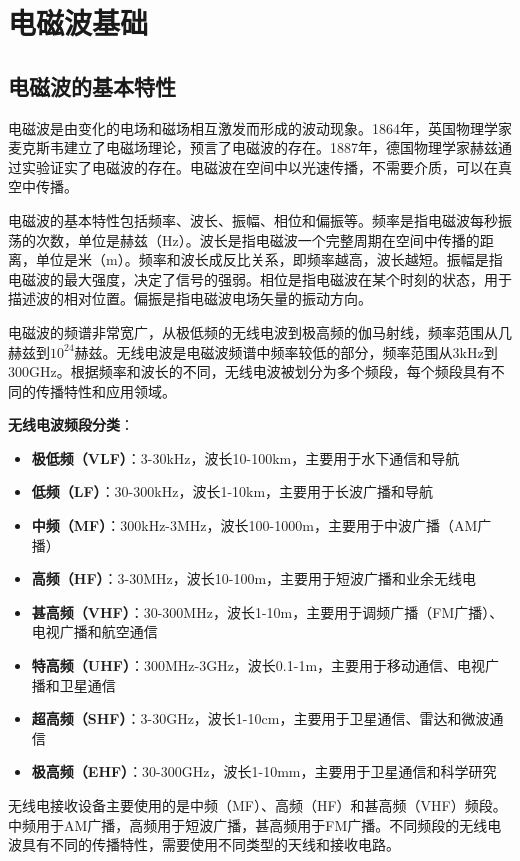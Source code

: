 \documentclass[12pt,UTF8]{ctexbook}
\begin{document}
\chapter{电磁波基础}

\section{电磁波的基本特性}

电磁波是由变化的电场和磁场相互激发而形成的波动现象。1864年，英国物理学家麦克斯韦建立了电磁场理论，预言了电磁波的存在。1887年，德国物理学家赫兹通过实验证实了电磁波的存在。电磁波在空间中以光速传播，不需要介质，可以在真空中传播。

电磁波的基本特性包括频率、波长、振幅、相位和偏振等。频率是指电磁波每秒振荡的次数，单位是赫兹（Hz）。波长是指电磁波一个完整周期在空间中传播的距离，单位是米（m）。频率和波长成反比关系，即频率越高，波长越短。振幅是指电磁波的最大强度，决定了信号的强弱。相位是指电磁波在某个时刻的状态，用于描述波的相对位置。偏振是指电磁波电场矢量的振动方向。

电磁波的频谱非常宽广，从极低频的无线电波到极高频的伽马射线，频率范围从几赫兹到$10^{24}$赫兹。无线电波是电磁波频谱中频率较低的部分，频率范围从3kHz到300GHz。根据频率和波长的不同，无线电波被划分为多个频段，每个频段具有不同的传播特性和应用领域。

\textbf{无线电波频段分类}：
\begin{itemize}[leftmargin=3.5em]
    \item \textbf{极低频（VLF）}：3-30kHz，波长10-100km，主要用于水下通信和导航
    \item \textbf{低频（LF）}：30-300kHz，波长1-10km，主要用于长波广播和导航
    \item \textbf{中频（MF）}：300kHz-3MHz，波长100-1000m，主要用于中波广播（AM广播）
    \item \textbf{高频（HF）}：3-30MHz，波长10-100m，主要用于短波广播和业余无线电
    \item \textbf{甚高频（VHF）}：30-300MHz，波长1-10m，主要用于调频广播（FM广播）、电视广播和航空通信
    \item \textbf{特高频（UHF）}：300MHz-3GHz，波长0.1-1m，主要用于移动通信、电视广播和卫星通信
    \item \textbf{超高频（SHF）}：3-30GHz，波长1-10cm，主要用于卫星通信、雷达和微波通信
    \item \textbf{极高频（EHF）}：30-300GHz，波长1-10mm，主要用于卫星通信和科学研究
\end{itemize}

无线电接收设备主要使用的是中频（MF）、高频（HF）和甚高频（VHF）频段。中频用于AM广播，高频用于短波广播，甚高频用于FM广播。不同频段的无线电波具有不同的传播特性，需要使用不同类型的天线和接收电路。
\end{document}
